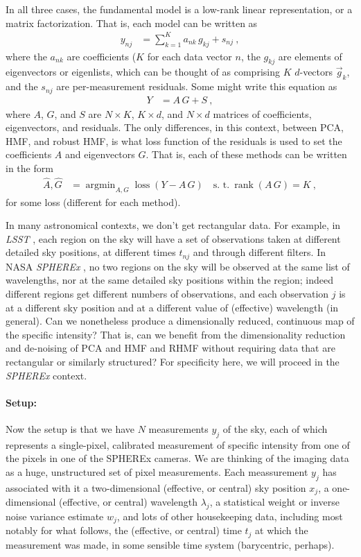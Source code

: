 \documentclass{article}
\DeclareMathOperator*{\argmin}{argmin}
\DeclareMathOperator{\loss}{loss}
\DeclareMathOperator{\rank}{rank}
\begin{document}
In all three cases, the fundamental model is a low-rank linear representation, or a matrix factorization.
That is, each model can be written as
\begin{align}
    y_{nj} &= \sum_{k=1}^K a_{nk}\,g_{kj} + s_{nj} ~,
\end{align}
where the $a_{nk}$ are coefficients ($K$ for each data vector $n$,
the $g_{kj}$ are elements of eigenvectors or eigenlists, which can be thought of as comprising $K$ $d$-vectors $\vec{g}_k$,
and the $s_{nj}$ are per-measurement residuals.
Some might write this equation as
\begin{align}
    Y &= A\,G + S~,
\end{align}
where $A$, $G$, and $S$ are $N\times K$, $K\times d$, and $N\times d$ matrices of coefficients, eigenvectors, and residuals.
The only differences, in this context, between PCA, HMF, and robust HMF, is what loss function of the residuals is used to set the coefficients $A$ and eigenvectors $G$.
That is, each of these methods can be written in the form
\begin{align}
    \hat{A}, \hat{G} &= \argmin_{A, G} \loss(Y - A\,G) \quad\text{s. t.}~\rank(A\,G) = K ~,
\end{align}
for some loss (different for each method).

In many astronomical contexts, we don't get rectangular data.
For example, in \textsl{LSST} \cite{lsst}, each region on the sky will have a set of observations taken at different detailed sky positions, at different times $t_{nj}$ and through different filters.
In NASA \textsl{SPHEREx} \cite{spherex}, no two regions on the sky will be observed at the same list of wavelengths, nor at the same detailed sky positions within the region; indeed different regions get different numbers of observations, and each observation $j$ is at a different sky position and at a different value of (effective) wavelength (in general).
Can we nonetheless produce a dimensionally reduced, continuous map of the specific intensity?
That is, can we benefit from the dimensionality reduction and de-noising of PCA and HMF and RHMF without requiring data that are rectangular or similarly structured?
For specificity here, we will proceed in the \textsl{SPHEREx} context.

\paragraph{Setup:}
Now the setup is that we have $N$ measurements $y_j$ of the sky, each of which represents a single-pixel, calibrated measurement of specific intensity from one of the pixels in one of the SPHEREx cameras.
We are thinking of the imaging data as a huge, unstructured set of pixel measurements.
Each meassurement $y_j$ has associated with it a two-dimensional (effective, or central) sky position $x_j$, a one-dimensional (effective, or central) wavelength $\lambda_j$, a statistical weight or inverse noise variance estimate $w_j$, and lots of other housekeeping data, including most notably for what follows, the (effective, or central) time $t_j$ at which the measurement was made, in some sensible time system (barycentric, perhaps).
\end{document}
